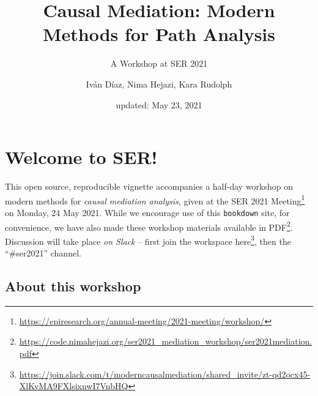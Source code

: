 \documentclass[
  12pt,
]{book}
\title{Causal Mediation: Modern Methods for Path Analysis}
\subtitle{A Workshop at SER 2021}
\author{Iván Díaz, Nima Hejazi, Kara Rudolph}
\date{updated: May 23, 2021}
\newcommand{\passthrough}[1]{#1}
\renewcommand{\href}[2]{#2\footnote{\url{#1}}}
\theoremstyle{definition}
\theoremstyle{definition}
\theoremstyle{definition}
\newcommand{\1}{\mathbbm{1}}
\begin{document}
\maketitle


\thispagestyle{empty}

\begin{center}
\end{center}

\setlength{\abovedisplayskip}{-5pt}
\setlength{\abovedisplayshortskip}{-5pt}

\mainmatter

{
\hypersetup{linkcolor=}
\setcounter{tocdepth}{2}
\tableofcontents
}
\hypertarget{welcome-to-ser}{%
\chapter*{Welcome to SER!}\label{welcome-to-ser}}


This open source, reproducible vignette accompanies a half-day workshop on
modern methods for \emph{causal mediation analysis}, given at the \href{https://epiresearch.org/annual-meeting/2021-meeting/workshop/}{SER 2021
Meeting} on
Monday, 24 May 2021. While we encourage use of this \passthrough{\lstinline!bookdown!} site, for
convenience, we have also made these workshop materials \href{https://code.nimahejazi.org/ser2021_mediation_workshop/ser2021mediation.pdf}{available in
PDF}.
Discussion will take place \emph{on Slack} -- first join the workspace
\href{https://join.slack.com/t/moderncausalmediation/shared_invite/zt-qd2ocx45-XlKvMA9FXlsixnwI7VnbHQ}{here},
then the ``\#ser2021'' channel.

\hypertarget{about}{%
\section{About this workshop}\label{about}}
\end{document}
